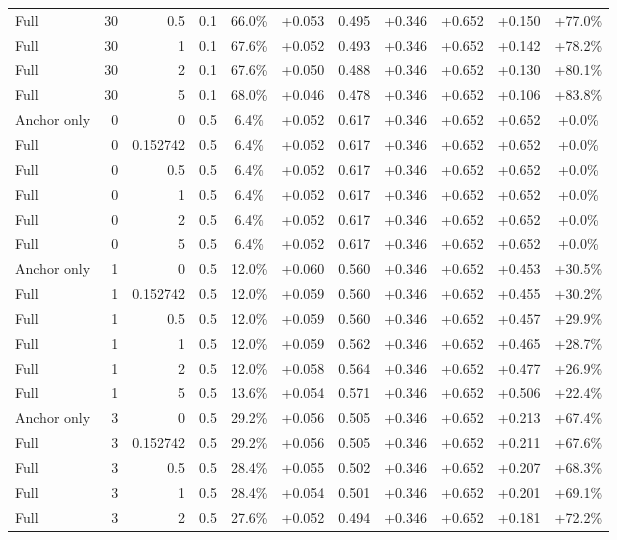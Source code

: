 \begin{table}[htbp]
\begin{tabular}{lrrrccccccc}
Full & 30 & 0.5 & 0.1 & 66.0\% & +0.053 & 0.495 & +0.346 & +0.652 & +0.150 & +77.0\% \\
Full & 30 & 1 & 0.1 & 67.6\% & +0.052 & 0.493 & +0.346 & +0.652 & +0.142 & +78.2\% \\
Full & 30 & 2 & 0.1 & 67.6\% & +0.050 & 0.488 & +0.346 & +0.652 & +0.130 & +80.1\% \\
Full & 30 & 5 & 0.1 & 68.0\% & +0.046 & 0.478 & +0.346 & +0.652 & +0.106 & +83.8\% \\
Anchor only & 0 & 0 & 0.5 & 6.4\% & +0.052 & 0.617 & +0.346 & +0.652 & +0.652 & +0.0\% \\
Full & 0 & 0.152742 & 0.5 & 6.4\% & +0.052 & 0.617 & +0.346 & +0.652 & +0.652 & +0.0\% \\
Full & 0 & 0.5 & 0.5 & 6.4\% & +0.052 & 0.617 & +0.346 & +0.652 & +0.652 & +0.0\% \\
Full & 0 & 1 & 0.5 & 6.4\% & +0.052 & 0.617 & +0.346 & +0.652 & +0.652 & +0.0\% \\
Full & 0 & 2 & 0.5 & 6.4\% & +0.052 & 0.617 & +0.346 & +0.652 & +0.652 & +0.0\% \\
Full & 0 & 5 & 0.5 & 6.4\% & +0.052 & 0.617 & +0.346 & +0.652 & +0.652 & +0.0\% \\
Anchor only & 1 & 0 & 0.5 & 12.0\% & +0.060 & 0.560 & +0.346 & +0.652 & +0.453 & +30.5\% \\
Full & 1 & 0.152742 & 0.5 & 12.0\% & +0.059 & 0.560 & +0.346 & +0.652 & +0.455 & +30.2\% \\
Full & 1 & 0.5 & 0.5 & 12.0\% & +0.059 & 0.560 & +0.346 & +0.652 & +0.457 & +29.9\% \\
Full & 1 & 1 & 0.5 & 12.0\% & +0.059 & 0.562 & +0.346 & +0.652 & +0.465 & +28.7\% \\
Full & 1 & 2 & 0.5 & 12.0\% & +0.058 & 0.564 & +0.346 & +0.652 & +0.477 & +26.9\% \\
Full & 1 & 5 & 0.5 & 13.6\% & +0.054 & 0.571 & +0.346 & +0.652 & +0.506 & +22.4\% \\
Anchor only & 3 & 0 & 0.5 & 29.2\% & +0.056 & 0.505 & +0.346 & +0.652 & +0.213 & +67.4\% \\
Full & 3 & 0.152742 & 0.5 & 29.2\% & +0.056 & 0.505 & +0.346 & +0.652 & +0.211 & +67.6\% \\
Full & 3 & 0.5 & 0.5 & 28.4\% & +0.055 & 0.502 & +0.346 & +0.652 & +0.207 & +68.3\% \\
Full & 3 & 1 & 0.5 & 28.4\% & +0.054 & 0.501 & +0.346 & +0.652 & +0.201 & +69.1\% \\
Full & 3 & 2 & 0.5 & 27.6\% & +0.052 & 0.494 & +0.346 & +0.652 & +0.181 & +72.2\% \\

\end{tabular}
\end{table}
